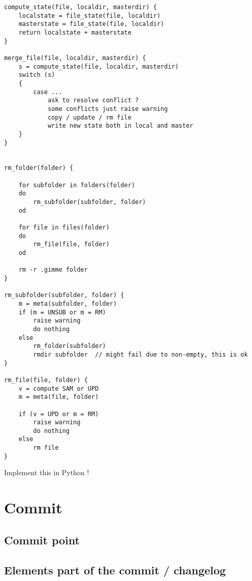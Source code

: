 \documentclass[10pt,a4paper]{article}
\begin{document}
\begin{lstlisting}[frame=ltbr, tabsize=4]
compute_state(file, localdir, masterdir) {
	localstate = file_state(file, localdir)
	masterstate = file_state(file, localdir)
	return localstate + masterstate
}

merge_file(file, localdir, masterdir) {
	s = compute_state(file, localdir, masterdir)
	switch (s)
	{
		case ...
			ask to resolve conflict ?
			some conflicts just raise warning
			copy / update / rm file
			write new state both in local and master
	}
}


rm_folder(folder) {

	for subfolder in folders(folder)
	do
		rm_subfolder(subfolder, folder)
	od
	
	for file in files(folder)
	do
		rm_file(file, folder)
	od
	
	rm -r .gimme folder
}

rm_subfolder(subfolder, folder) {
	m = meta(subfolder, folder)
	if (m = UNSUB or m = RM)
		raise warning
		do nothing
	else
		rm_folder(subfolder)
		rmdir subfolder  // might fail due to non-empty, this is ok
}

rm_file(file, folder) {
	v = compute SAM or UPD
	m = meta(file, folder)

	if (v = UPD or m = RM)
		raise warning
		do nothing
	else
		rm file
}
\end{lstlisting}

Implement this in Python !

\section{Commit}

\subsection{Commit point}

\subsection{Elements part of the commit / changelog}
\end{document}
